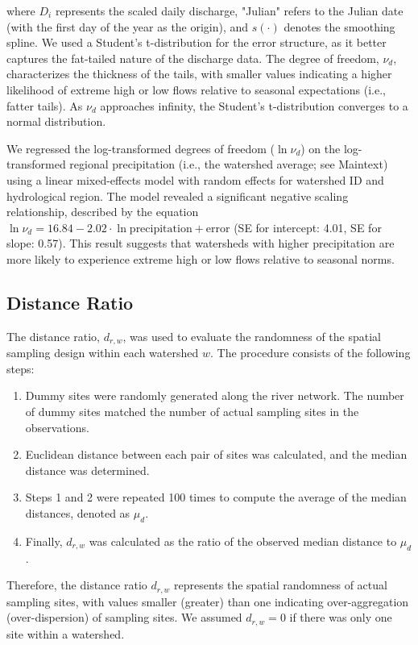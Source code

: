 \documentclass[11pt, class=article, crop=false]{standalone}
\begin{document}
where $D_i$ represents the scaled daily discharge, "Julian" refers to the Julian date (with the first day of the year as the origin), and $s(\cdot)$ denotes the smoothing spline.
We used a Student's t-distribution for the error structure, as it better captures the fat-tailed nature of the discharge data.
The degree of freedom, $\nu_d$, characterizes the thickness of the tails, with smaller values indicating a higher likelihood of extreme high or low flows relative to seasonal expectations (i.e., fatter tails).
As $\nu_d$ approaches infinity, the Student's t-distribution converges to a normal distribution.

We regressed the log-transformed degrees of freedom ($\ln \nu_d$) on the log-transformed regional precipitation (i.e., the watershed average; see Maintext) using a linear mixed-effects model with random effects for watershed ID and hydrological region.
The model revealed a significant negative scaling relationship, described by the equation $\ln \nu_d = 16.84 - 2.02 \cdot \ln \text{precipitation} + \text{error}$ (SE for intercept: 4.01, SE for slope: 0.57).
This result suggests that watersheds with higher precipitation are more likely to experience extreme high or low flows relative to seasonal norms.

\subsection{Distance Ratio}

The distance ratio, \(d_{r,w}\), was used to evaluate the randomness of the spatial sampling design within each watershed \(w\). The procedure consists of the following steps:

\begin{enumerate}
    \item Dummy sites were randomly generated along the river network. The number of dummy sites matched the number of actual sampling sites in the observations.
    \item Euclidean distance between each pair of sites was calculated, and the median distance was determined.
    \item Steps 1 and 2 were repeated 100 times to compute the average of the median distances, denoted as \(\mu_d\).
    \item Finally, \(d_{r,w}\) was calculated as the ratio of the observed median distance to \(\mu_d\).
\end{enumerate}

Therefore, the distance ratio $d_{r,w}$ represents the spatial randomness of actual sampling sites, with values smaller (greater) than one indicating over-aggregation (over-dispersion) of sampling sites.
We assumed $d_{r,w} = 0$ if there was only one site within a watershed.
\end{document}
